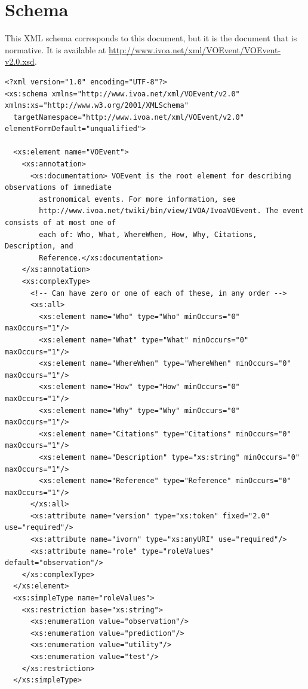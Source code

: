 \documentclass[11pt,a4paper]{ivoa}
\begin{document}
\section{Schema}
\label{sec7}
This XML schema corresponds to this document, but it is the document that is normative. It is available at \url{http://www.ivoa.net/xml/VOEvent/VOEvent-v2.0.xsd}. 
{\footnotesize
\begin{verbatim}
<?xml version="1.0" encoding="UTF-8"?>
<xs:schema xmlns="http://www.ivoa.net/xml/VOEvent/v2.0" xmlns:xs="http://www.w3.org/2001/XMLSchema"
  targetNamespace="http://www.ivoa.net/xml/VOEvent/v2.0" elementFormDefault="unqualified">

  <xs:element name="VOEvent">
    <xs:annotation>
      <xs:documentation> VOEvent is the root element for describing observations of immediate
        astronomical events. For more information, see
        http://www.ivoa.net/twiki/bin/view/IVOA/IvoaVOEvent. The event consists of at most one of
        each of: Who, What, WhereWhen, How, Why, Citations, Description, and
        Reference.</xs:documentation>
    </xs:annotation>
    <xs:complexType>
      <!-- Can have zero or one of each of these, in any order -->
      <xs:all>
        <xs:element name="Who" type="Who" minOccurs="0" maxOccurs="1"/>
        <xs:element name="What" type="What" minOccurs="0" maxOccurs="1"/>
        <xs:element name="WhereWhen" type="WhereWhen" minOccurs="0" maxOccurs="1"/>
        <xs:element name="How" type="How" minOccurs="0" maxOccurs="1"/>
        <xs:element name="Why" type="Why" minOccurs="0" maxOccurs="1"/>
        <xs:element name="Citations" type="Citations" minOccurs="0" maxOccurs="1"/>
        <xs:element name="Description" type="xs:string" minOccurs="0" maxOccurs="1"/>
        <xs:element name="Reference" type="Reference" minOccurs="0" maxOccurs="1"/>
      </xs:all>
      <xs:attribute name="version" type="xs:token" fixed="2.0" use="required"/>
      <xs:attribute name="ivorn" type="xs:anyURI" use="required"/>
      <xs:attribute name="role" type="roleValues" default="observation"/>
    </xs:complexType>
  </xs:element>
  <xs:simpleType name="roleValues">
    <xs:restriction base="xs:string">
      <xs:enumeration value="observation"/>
      <xs:enumeration value="prediction"/>
      <xs:enumeration value="utility"/>
      <xs:enumeration value="test"/>
    </xs:restriction>
  </xs:simpleType>



\end{verbatim}}
\end{document}
